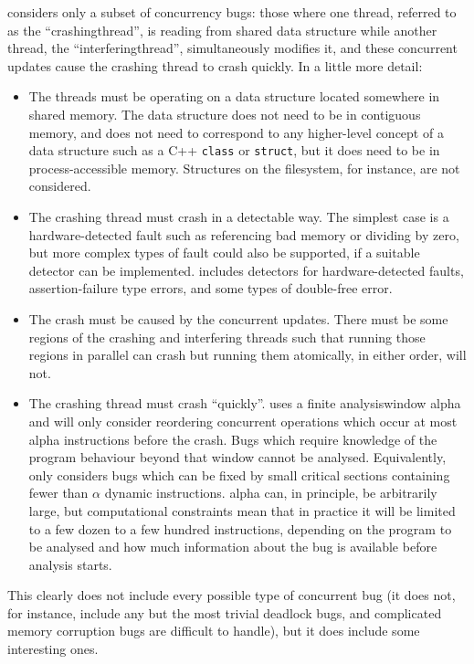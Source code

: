 {\Technique} considers only a subset of concurrency bugs: those where
one thread, referred to as the ``\gls{crashingthread}'', is reading
from shared data structure while another thread, the
``\gls{interferingthread}'', simultaneously modifies it, and these
concurrent updates cause the crashing thread to crash quickly.  In a
little more detail:
\begin{itemize}
\item The threads must be operating on a data structure located
  somewhere in shared memory.  The data structure does not need to be
  in contiguous memory, and does not need to correspond to any
  higher-level concept of a data structure such as a C++
  \texttt{class} or \texttt{struct}, but it does need to be in
  process-accessible memory.  Structures on the filesystem, for
  instance, are not considered.
\item The crashing thread must crash in a detectable way.  The
  simplest case is a hardware-detected fault such as referencing bad
  memory or dividing by zero, but more complex types of fault could
  also be supported, if a suitable detector can be implemented.
  {\Implementation} includes detectors for hardware-detected faults,
  assertion-failure type errors, and some types of double-free error.
\item The crash must be caused by the concurrent updates.  There must
  be some regions of the crashing and interfering threads such that
  running those regions in parallel can crash but running them
  atomically, in either order, will not.
\item The crashing thread must crash ``quickly''.  {\Technique} uses a
  finite \gls{analysiswindow} \gls{alpha} and will only consider
  reordering concurrent operations which occur at most \gls{alpha}
  instructions before the crash.  Bugs which require knowledge of the
  program behaviour beyond that window cannot be analysed.
  Equivalently, {\technique} only considers bugs which can be fixed by
  small critical sections containing fewer than $\alpha$ dynamic
  instructions.  \gls{alpha} can, in principle, be arbitrarily large,
  but computational constraints mean that in practice it will be
  limited to a few dozen to a few hundred instructions, depending on
  the program to be analysed and how much information about the bug is
  available before analysis starts.
\end{itemize}
This clearly does not include every possible type of concurrent bug
(it does not, for instance, include any but the most trivial deadlock
bugs, and complicated memory corruption bugs are difficult to handle),
but it does include some interesting ones.

